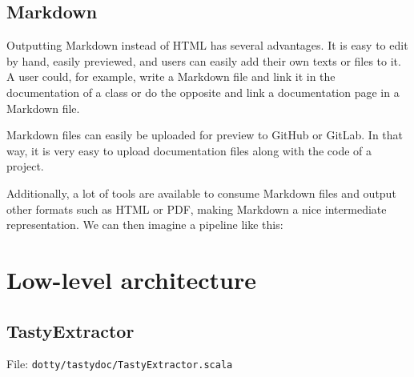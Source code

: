 \documentclass{report}
\begin{document}
\subsection{Markdown}
Outputting Markdown instead of HTML has several advantages. It is easy to edit by hand, easily previewed, and users can easily add their own texts or files to it. A user could, for example, write a Markdown file and link it in the documentation of a class or do the opposite and link a documentation page in a Markdown file.

Markdown files can easily be uploaded for preview to GitHub or GitLab. In that way, it is very easy to upload documentation files along with the code of a project.

Additionally, a lot of tools are available to consume Markdown files and output other formats such as HTML or PDF, making Markdown a nice intermediate representation. We can then imagine a pipeline like this:
\begin{center}
\end{center}

\section{Low-level architecture}
\subsection{TastyExtractor}
File: \texttt{dotty/tastydoc/TastyExtractor.scala}
\end{document}
